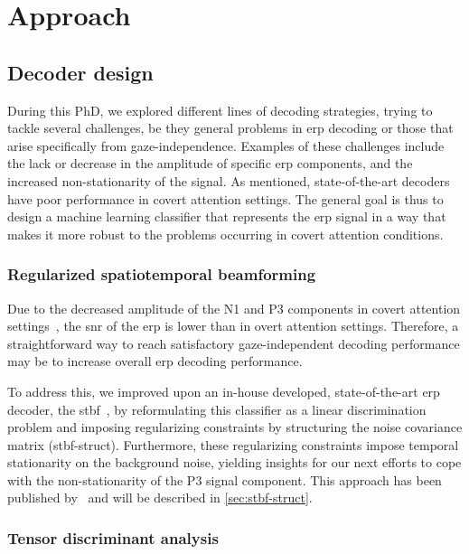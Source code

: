 \section{Approach}

\subsection{Decoder design}

During this PhD, we explored different lines of decoding strategies,
trying to tackle several challenges, be they general problems in \ac{erp} decoding
or those that arise specifically from gaze-independence.
Examples of these challenges include the lack or decrease in the amplitude of specific \ac{erp} components, and the increased
non-stationarity of the signal.
As mentioned, state-of-the-art decoders have poor performance in covert attention
settings.
The general goal is thus to design a machine learning classifier that represents
the \ac{erp} signal in a way that makes it more robust to the problems
occurring in covert attention conditions.

\subsubsection{Regularized spatiotemporal beamforming}

Due to the decreased amplitude of the N1 and P3 components in covert attention
settings~\cite{Treder2010}, the \ac{snr} of
the \ac{erp} is lower than in overt attention settings.
Therefore, a straightforward way to reach satisfactory
gaze-independent decoding performance may be to increase overall \ac{erp}
decoding performance.

To address this, we improved upon an in-house developed, state-of-the-art \ac{erp}
decoder, the \ac{stbf}~\cite{Wittevrongel2016}, by reformulating
this classifier as a linear discrimination problem and
imposing regularizing constraints by structuring the noise covariance matrix
(\acs{stbf-struct}).
Furthermore, these regularizing constraints impose temporal stationarity on
the background noise, yielding insights for our next
efforts to cope with the non-stationarity of the P3 signal component.
This approach has been published by~\textcite{VanDenKerchove2022} and will be
described in \cref{sec:stbf-struct}.

\subsubsection{Tensor discriminant analysis}


